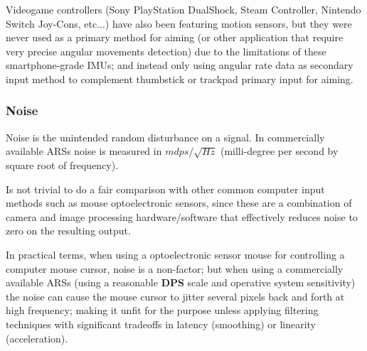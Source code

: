 \documentclass[10pt, twocolumn, a4paper]{article}
\begin{document}
        Videogame controllers (Sony PlayStation DualShock, Steam Controller, Nintendo Switch Joy-Cons, etc...) have also been featuring motion sensors, but they were never used as a primary method for aiming (or other application that require very precise angular movements detection) due to the limitations of these smartphone-grade IMUs; and instead only using angular rate data as secondary input method to complement thumbstick or trackpad primary input for aiming.

    \subsubsection{Noise}
    \label{problem.noise}
        Noise is the unintended random disturbance on a signal. In commercially available ARSs noise is measured in $ mdps / \sqrt{Hz} $ (milli-degree per second by square root of frequency).

        Is not trivial to do a fair comparison with other common computer input methods such as mouse optoelectronic sensors, since these are a combination of camera and image processing hardware/software that effectively reduces noise to zero on the resulting output. \cite{optical_mouse}

        In practical terms, when using a optoelectronic sensor mouse for controlling a computer mouse cursor, noise is a non-factor; but when using a commercially available ARSs (using a reasonable {\textbf{DPS}} scale and operative system sensitivity) the noise can cause the mouse cursor to jitter several pixels back and forth at high frequency; making it unfit for the purpose unless applying filtering techniques with significant tradeoffs in latency (smoothing) or linearity (acceleration).
\end{document}
